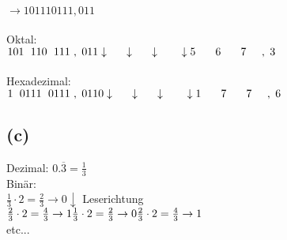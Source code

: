 \documentclass[a4paper,12pt]{article}
\begin{document}
	\paragraph{}
	$\to 101110111,011$\\
	\\
	Oktal:\\
	$101 \hspace{6pt} 110 \hspace{6pt} 111\hspace{3pt},\hspace{3pt} 011\\
	\downarrow \hspace{18pt} \downarrow \hspace{18pt} \downarrow \hspace{22pt} \downarrow\\
	5 \hspace{18pt} 6 \hspace{18pt} 7 \hspace{14pt},\hspace{3pt} 3$\\
	\\
	Hexadezimal:\\
	$1 \hspace{6pt} 0111 \hspace{6pt} 0111 \hspace{3pt},\hspace{3pt} 0110 \\
	\downarrow \hspace{18pt} \downarrow \hspace{18pt} \downarrow \hspace{22pt} \downarrow\\
	1 \hspace{18pt} 7 \hspace{18pt} 7 \hspace{14pt},\hspace{3pt} 6$
	\pagebreak
	\subsection*{(c)}
	Dezimal: $0.\overline{3} = \frac{1}{3}$\\
	Bin\"ar: \\
	$\frac{1}{3} \cdot 2 = \frac{2}{3} \to 0 \downarrow$ Leserichtung \\
	$\frac{2}{3} \cdot 2 = \frac{4}{3} \to 1 \\
	\frac{1}{3} \cdot 2 = \frac{2}{3} \to 0 \\
	\frac{2}{3} \cdot 2 = \frac{4}{3} \to 1 $\\
	etc...
\end{document}
